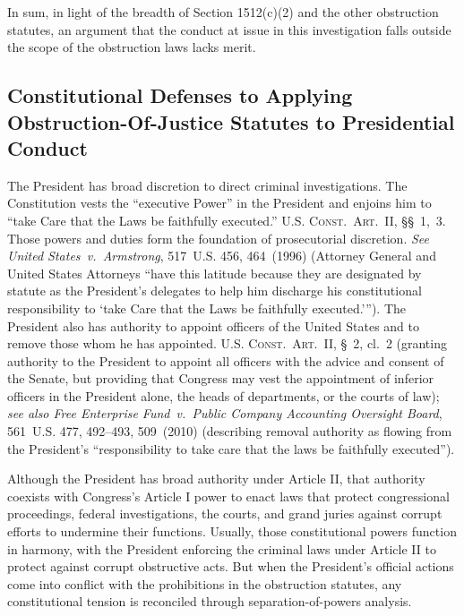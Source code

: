 \hr

In sum, in light of the breadth of Section 1512(c)(2) and the other obstruction statutes, an argument that the conduct at issue in this investigation falls outside the scope of the obstruction laws lacks merit.

\subsection{Constitutional Defenses to Applying Obstruction-Of-Justice Statutes to Presidential Conduct}

The President has broad discretion to direct criminal investigations.
The Constitution vests the ``executive Power'' in the President and enjoins him to ``take Care that the Laws be faithfully executed.'' \textsc{U.S. Const.\ Art.~II}, \S\S~1,~3.
Those powers and duties form the foundation of prosecutorial discretion.
\textit{See United States~v.\ Armstrong}, 517~U.S. 456, 464~(1996) (Attorney General and United States Attorneys ``have this latitude because they are designated by statute as the President's delegates to help him discharge his constitutional responsibility to `take Care that the Laws be faithfully executed.'\thinspace'').
The President also has authority to appoint officers of the United States and to remove those whom he has appointed.
\textsc{U.S. Const.\ Art.~II}, \S~2, cl.~2 (granting authority to the President to appoint all officers with the advice and consent of the Senate, but providing that Congress may vest the appointment of inferior officers in the President alone, the heads of departments, or the courts of law);
\textit{see also Free Enterprise Fund~v.\ Public Company Accounting Oversight Board}, 561~U.S. 477, 492--493, 509~(2010) (describing removal authority as flowing from the President's ``responsibility to take care that the laws be faithfully executed'').

Although the President has broad authority under Article II, that authority coexists with Congress's Article I power to enact laws that protect congressional proceedings, federal investigations, the courts, and grand juries against corrupt efforts to undermine their functions.
Usually, those constitutional powers function in harmony, with the President enforcing the criminal laws under Article II to protect against corrupt obstructive acts.
But when the President's official actions come into conflict with the prohibitions in the obstruction statutes, any constitutional tension is reconciled through separation-of-powers analysis.

